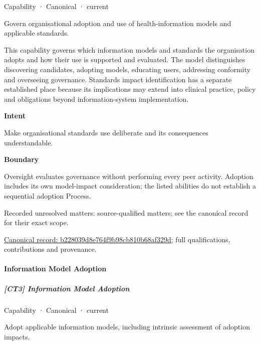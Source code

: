 \label{element:b228039d8e764f9b98cb810b68af329d}
{\small Capability · Canonical · current}\par

Govern organisational adoption and use of health-information models and applicable standards.



This capability governs which information models and standards the organisation adopts and how their use is supported and evaluated. The model distinguishes discovering candidates, adopting models, educating users, addressing conformity and overseeing governance. Standards impact identification has a separate established place because its implications may extend into clinical practice, policy and obligations beyond information-system implementation.



\textbf{Intent}



Make organisational standards use deliberate and its consequences understandable.



\textbf{Boundary}



Oversight evaluates governance without performing every peer activity. Adoption includes its own model-impact consideration; the listed abilities do not establish a sequential adoption Process.


{\small Recorded unresolved matters: source-qualified matters; see the canonical record for their exact scope.}\par
{\footnotesize \href{../../../../continuum/strategy/capability/b228039d8e764f9b98cb810b68af329d.md}{Canonical record: b228039d8e764f9b98cb810b68af329d}; full qualifications, contributions and provenance.}\par
\paragraph{Information Model Adoption}

\subparagraph{[CT3] Information Model Adoption}

\label{element:0c3ce0778d6342b6b100e1e30e777fbe}
{\small Capability · Canonical · current}\par

Adopt applicable information models, including intrinsic assessment of adoption impacts.



